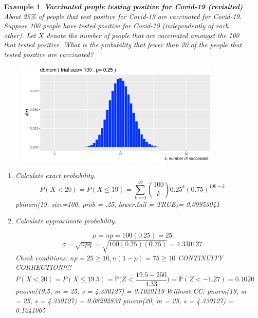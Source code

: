 \documentclass[12pt]{amsart}
\newtheorem{example}[theorem]{Example}
\newcommand{\m}{\mu}
\newcommand{\s}{\sigma}
\newcommand{\bP}{\mathbb{P}}
\begin{document}
{\newpage
\begin{example}\label{VaccBinom10}  \textbf{Vaccinated people testing positive for Covid-19 (revisited)} \newline
About 25\% of people that test positive for Covid-19 are vaccinated for Covid-19.\newline
Suppose 100 people have tested positive for Covid-19 (independently of each other). \newline
Let $X$ denote the number of people that are vaccinated amongst the 100 that tested positive.\newline
What is the probability that fewer than 20 of the people that tested positive are vaccinated?
\begin{figure}[h!]
  \includegraphics[width=4in]{img/binom_n100_p25_crop.png}
\end{figure}



\begin{enumerate}
\item Calculate exact probability.
\color{blue}
$$
P(X <  20) = P(X \leq 19) = \sum_{k=0}^{19} {100\choose k}0.25^k(0.75)^{100-k} 
$$
pbinom(19, size=100, prob = .25, lower.tail = TRUE)= 0.09953041

\color{black}


\vspace{2cm}

\item Calculate approximate probability.

\color{blue}
$$\m = np = 100(0.25) = 25$$ 
$$\s = \sqrt{npq} = \sqrt{100(0.25)(0.75)} = 4.330127$$
Check conditions: $np = 25 \geq 10, n(1-p) = 75 \geq 10$\newline
CONTINUITY CORRECTION!!!!
$$
P(X <  20) = P(X \leq 19.5) = \bP\Big( Z <  \frac{19.5-250}{4.33}\Big) = \bP(  Z <  -1.27) = 0.1020
$$
pnorm(19.5, m = 25, s = 4.330127) =  0.1020119\newline
Without CC:\newline
pnorm(19, m = 25, s = 4.330127) =  0.08292833\newline
pnorm(20, m = 25, s = 4.330127) =  0.1241065


\end{enumerate}
\end{example}}
\end{document}
